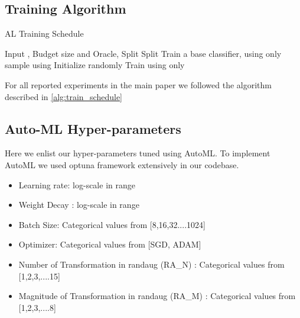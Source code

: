 \documentclass[10pt,twocolumn,letterpaper]{article}
\begin{document}
\subsection{Training Algorithm}

\begin{algorithm}[ht]
    \SetAlgoLined
	\caption{AL Training Schedule}
	\label{alg:train_schedule}
	
	\begin{algorithmic}[1]
	    \STATE Input , Budget size  and Oracle, 
        \STATE Split 
        \STATE Split 
        \STATE Train a base classifier,  using only 
        \STATE 
            \STATE sample  using 
            \STATE  \STATE 
            \STATE 
            \STATE Initialize randomly
                \STATE Train  using only 
            \ENDWHILE
        \ENDWHILE
	\end{algorithmic}
\end{algorithm}

For all reported experiments in the main paper we followed the algorithm described in \cref{alg:train_schedule}




\subsection{Auto-ML Hyper-parameters}
\label{sup:AutoMLhyperparamssection}

Here we enlist our hyper-parameters tuned using AutoML. To implement AutoML we used optuna framework extensively in our codebase.
\begin{itemize}
    \item Learning rate: log-scale in range 
    \item Weight Decay : log-scale in range 
    \item Batch Size: Categorical values from [8,16,32....1024]
    \item Optimizer: Categorical values from [SGD, ADAM]
    \item Number of Transformation in randaug (RA\_N) : Categorical values from [1,2,3,....15]
    \item Magnitude of Transformation in randaug (RA\_M) : Categorical values from [1,2,3,....8]
\end{itemize}
\end{document}
